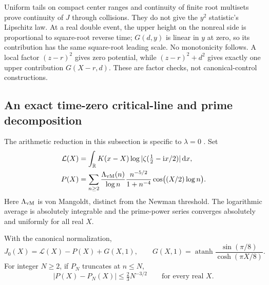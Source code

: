 Uniform tails on compact center ranges and continuity of finite root
multisets prove continuity of \(J\) through collisions. They do not
give the \(y^2\) statistic's Lipschitz law. At a real double event, the
upper height on the nonreal side is proportional to square-root reverse
time; \(G(d,y)\) is linear in \(y\) at zero, so its contribution has
the same square-root leading scale. No monotonicity follows. A local
factor \((z-r)^2\) gives zero potential, while
\((z-r)^2+d^2\) gives exactly one upper contribution \(G(X-r,d)\).
These are factor checks, not canonical-control constructions.

\subsection{An exact time-zero critical-line and prime decomposition}
The arithmetic reduction in this subsection is specific to \(\lambda=0\)
\cite{MetricComparison,PrimeBaselineAssessment}. Set
\begin{align}\label{eq:green-prime-definitions}
 \mathcal L(X)&=\int_\mathbb R K(x-X)
                   \log|\zeta(\tfrac12-\mathrm i x/2)|\,\mathrm d x,\nonumber\\
 P(X)&=\sum_{n\ge2}\frac{\Lambda_{\rm vM}(n)}{\log n}
          \frac{n^{-5/2}}{1+n^{-4}}\cos\bigl((X/2)\log n\bigr).
\end{align}
Here \(\Lambda_{\rm vM}\) is von Mangoldt, distinct from the Newman
threshold. The logarithmic average is absolutely integrable and the
prime-power series converges absolutely and uniformly for all real \(X\).
\begin{proposition}\label{prop:green-prime}
With the canonical normalization,
\begin{equation}\label{eq:green-prime-identity}
 J_0(X)=\mathcal L(X)-P(X)+G(X,1),\qquad
 G(X,1)=\operatorname{atanh}\frac{\sin(\pi/8)}{\cosh(\pi X/8)}.
\end{equation}
For integer \(N\ge2\), if \(P_N\) truncates at \(n\le N\),
\begin{equation}\label{eq:green-prime-tail}
 |P(X)-P_N(X)|\le\tfrac23N^{-3/2}\qquad\text{for every real \(X\)}.
\end{equation}
\end{proposition}
